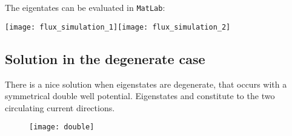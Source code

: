  The eigentates can be evaluated in \verb|MatLab|:
 \begin{center}
   \texttt{[image: flux\_simulation\_1]}\texttt{[image: flux\_simulation\_2]}
 \end{center}

 \newpage
 \subsection{Solution in the degenerate case}
 There  is a  nice  solution when  eigenstates  are degenerate,  that
 occurs  with  a  symmetrical  double  well  potential.   Eigenstates
    and  \iket{\psi(2\pi)}   constitute   to  the   two
 circulating current directions.

\begin{figure}[h]
  \centering \texttt{[image: double]}
\end{figure}

\noindent


